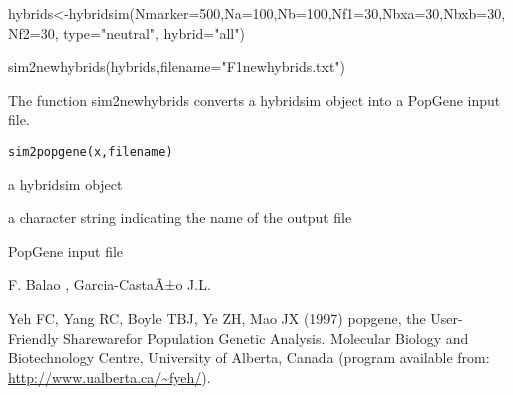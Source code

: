 \documentclass[letterpaper]{book}
\begin{document}
%
\begin{Examples}
\begin{ExampleCode}
hybrids<-hybridsim(Nmarker=500,Na=100,Nb=100,Nf1=30,Nbxa=30,Nbxb=30, Nf2=30, type="neutral", hybrid="all")

sim2newhybrids(hybrids,filename="F1newhybrids.txt")
\end{ExampleCode}
\end{Examples}
%
\begin{Description}\relax
The function sim2newhybrids converts a hybridsim object into a PopGene input file. 

\end{Description}
%
\begin{Usage}
\begin{verbatim}
sim2popgene(x,filename)

\end{verbatim}
\end{Usage}
%
\begin{Arguments}
\begin{ldescription}

\item[\code{x}] 
a hybridsim object

\item[\code{filename}] 
a character string indicating the name of the output file
\end{ldescription}
\end{Arguments}
%
\begin{Value}
PopGene input file
\end{Value}
%
\begin{Author}\relax
F. Balao , Garcia-CastaÃ±o J.L.
\end{Author}
%
\begin{References}\relax
Yeh FC, Yang RC, Boyle TBJ, Ye ZH, Mao JX (1997) popgene, the User-Friendly Sharewarefor Population Genetic Analysis. Molecular Biology and Biotechnology Centre, University of Alberta, Canada (program available from: \url{http://www.ualberta.ca/~fyeh/}).
\end{References}
%
\begin{SeeAlso}\relax
{}
\end{SeeAlso}
\end{document}
